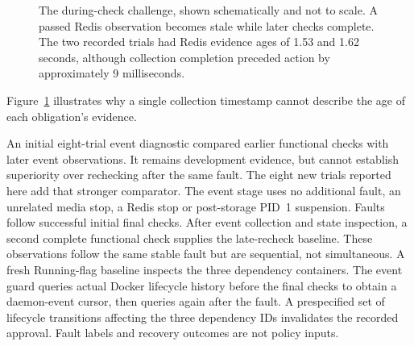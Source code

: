 \documentclass[manuscript,review,nonacm]{acmart}
\begin{document}
\begin{figure}[t]
\centering
{}
\caption{The during-check challenge, shown schematically and not to scale. A passed Redis observation becomes stale while later checks complete. The two recorded trials had Redis evidence ages of 1.53 and 1.62 seconds, although collection completion preceded action by approximately 9 milliseconds.}
\label{fig:evidence-age}
\end{figure}
Figure~\ref{fig:evidence-age} illustrates why a single collection timestamp cannot describe the age of each obligation's evidence.

An initial eight-trial event diagnostic compared earlier functional checks with later event observations. It remains development evidence, but cannot establish superiority over rechecking after the same fault. The eight new trials reported here add that stronger comparator. The event stage uses no additional fault, an unrelated media stop, a Redis stop or post-storage PID~1 suspension. Faults follow successful initial final checks. After event collection and state inspection, a second complete functional check supplies the late-recheck baseline. These observations follow the same stable fault but are sequential, not simultaneous. A fresh Running-flag baseline inspects the three dependency containers. The event guard queries actual Docker lifecycle history before the final checks to obtain a daemon-event cursor, then queries again after the fault. A prespecified set of lifecycle transitions affecting the three dependency IDs invalidates the recorded approval. Fault labels and recovery outcomes are not policy inputs.
\end{document}
